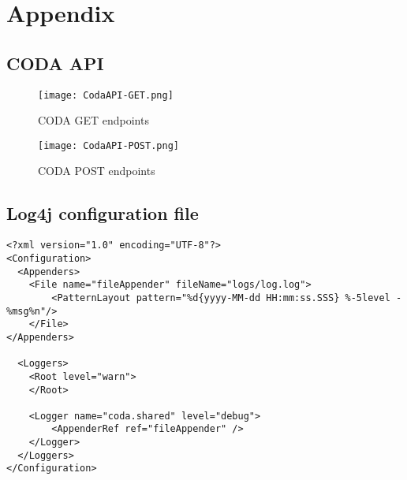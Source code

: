 {}
\chapter*{Appendix}



\appendix

\section*{CODA API}
\label{appendix:CodaAPI}
\begin{figure}
	\texttt{[image: CodaAPI-GET.png]}
	\caption{CODA GET endpoints}
\end{figure}
\begin{figure}
	\texttt{[image: CodaAPI-POST.png]}
	\caption{CODA POST endpoints}
\end{figure}

\section*{Log4j configuration file}
\label{appendix:Log4j}
\begin{lstlisting}[caption={Log4j configuration file.},captionpos=b]
<?xml version="1.0" encoding="UTF-8"?>
<Configuration>
  <Appenders>
    <File name="fileAppender" fileName="logs/log.log">
        <PatternLayout pattern="%d{yyyy-MM-dd HH:mm:ss.SSS} %-5level - %msg%n"/>
    </File>
</Appenders>

  <Loggers>
    <Root level="warn">
    </Root>

    <Logger name="coda.shared" level="debug">
        <AppenderRef ref="fileAppender" />
    </Logger>
  </Loggers>
</Configuration>
\end{lstlisting}
\newpage


